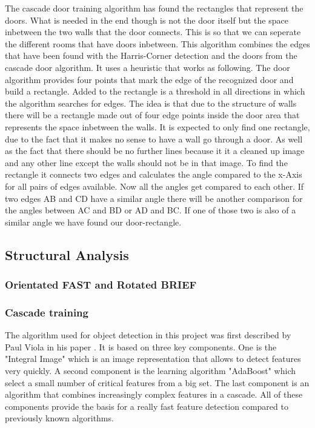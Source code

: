 The cascade door training algorithm has found the rectangles that represent the doors. What is needed in the end though is not the door itself but the space inbetween the two walls that the door connects. This is so that we can seperate the different rooms that have doors inbetween.
This algorithm combines the edges that have been found with the Harris-Corner detection and the doors from the cascade door algorithm. It uses a heuristic that works as following. The door algorithm provides four points that mark the edge of the recognized door and build a rectangle.
Added to the rectangle is  a threshold in all directions in which the algorithm searches for edges. The idea is that due to the structure of walls there will be a rectangle made out of four edge points inside the door area that represents the space inbetween the walls. It is expected to only find one rectangle, due to the fact that it makes no sense to have a wall go through a door. As well as the fact that there should be no further lines because it it a cleaned up image and any other line except the walls should not be in that image.
To find the rectangle it connects two edges and calculates the angle compared to the x-Axis for all pairs of edges available. Now all the angles get compared to each other. If two edges AB and CD have a similar angle there will be another comparison for the angles between AC and BD or AD and BC. If one of those two is also of a similar angle we have found our door-rectangle.

\subsection{Structural Analysis}
\subsubsection{Orientated FAST and Rotated BRIEF}
\subsubsection{Cascade training}
The algorithm used for object detection in this project was first described by Paul Viola in his paper . It is based on three key components. One is the "Integral Image" which is an image representation that allows to detect features very quickly. A second component is the learning algorithm "AdaBoost" which select a small number of critical features from a big set. The last component is an algorithm that combines increasingly complex features in a cascade. All of these components provide the basis for a really fast feature detection compared to previously known algorithms.

